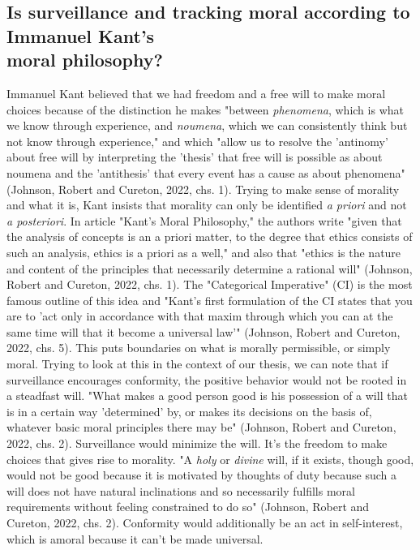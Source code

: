 \documentclass[11pt]{article}
\begin{document}
\subsection{Is surveillance and tracking moral according to Immanuel Kant's \\
moral philosophy?}
Immanuel Kant believed that we had freedom and a free will to make moral choices because of the distinction he makes "between \textit{phenomena}, which is what we know through experience, and \textit{noumena}, which we can consistently think but not know through experience," and which "allow us to resolve the 'antinomy' about free will by interpreting the 'thesis' that free will is possible as about noumena and the 'antithesis' that every event has a cause as about phenomena" (Johnson, Robert and Cureton, 2022, chs. 1). Trying to make sense of morality and what it is, Kant insists that morality can only be identified \textit{a priori} and not \textit{a posteriori}. In article "Kant’s Moral Philosophy," the authors write "given that the analysis of concepts is an a priori matter, to the degree that ethics consists of such an analysis, ethics is a priori as a well," and also that "ethics is the nature and content of the principles that necessarily determine a rational will" (Johnson, Robert and Cureton, 2022, chs. 1). The "Categorical Imperative" (CI) is the most famous outline of this idea and "Kant’s first formulation of the CI states that you are to 'act only in accordance with that maxim through which you can at the same time will that it become a universal law'" (Johnson, Robert and Cureton, 2022, chs. 5). This puts boundaries on what is morally permissible, or simply moral. Trying to look at this in the context of our thesis, we can note that if surveillance encourages conformity, the positive behavior would not be rooted in a steadfast will. "What makes a good person good is his possession of a will that is in a certain way 'determined' by, or makes its decisions on the basis of, whatever basic moral principles there may be" (Johnson, Robert and Cureton, 2022, chs. 2). Surveillance would minimize the will. It's the freedom to make choices that gives rise to morality. "A \textit{holy} or \textit{divine} will, if it exists, though good, would not be good because it is motivated by thoughts of duty because such a will does not have natural inclinations and so necessarily fulfills moral requirements without feeling constrained to do so" (Johnson, Robert and Cureton, 2022, chs. 2). Conformity would additionally be an act in self-interest, which is amoral because it can't be made universal. \\ \\
\end{document}
